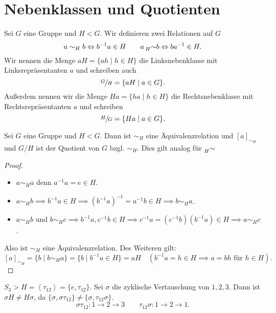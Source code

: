 \section{Nebenklassen und Quotienten}

\begin{definition}
	Sei $G$ eine Gruppe und $H < G$.
	Wir definieren zwei Relationen auf $G$ 
	\[
		a \sim_{H} b \Leftrightarrow b^{-1} a \in H \qquad a \prescript{}{H}{\sim} b \Leftrightarrow b a^{-1} \in H
	.\] 
	Wir nennen die Menge $a H = \{a h \mid h \in H\} $ die Linksnebenklasse mit Linksrepräsentanten $a$ und schreiben auch
	\[
	\sfrac{G}{H} = \{a H \mid a \in G\} 
	.\] 
	Außerdem nennen wir die Menge $H a = \{h a \mid h \in H\} $ die Rechtsnebenklasse mit Rechtsrepräsentanten $a$ und schreiben 
	\[
	\sfrac{H}{G} = \{H a \mid a \in G\} 
	.\] 
\end{definition}

\begin{lemma}
	Sei $G$ eine Gruppe und $H < G$. Dann ist $\sim_{H}$ eine Äquivalenzrelation und $[ a ]_{\sim_{H}}$ und $G / H$ ist der Quotient von $G$ bzgl. $\sim_{H}$.
	Dies gilt analog für $\prescript{}{H}{\sim}$
\end{lemma}

\begin{proof}
	\begin{itemize}
		\item $a \sim_{H} a$ denn $a^{-1} a = e \in H$.
		\item $a \sim_{H} b \implies b^{-1} a \in H \implies (b^{-1} a)^{-1} = a^{-1} b \in H \implies b \sim_{H} a$.
		\item $a \sim_{H} b $ und $b \sim_{H} c \implies b^{-1} a, c^{-1} b \in H \implies c^{-1} a = (c^{-1} b) (b^{-1} a) \in H \implies a \sim_{H} c$.
	\end{itemize}
	Also ist $\sim_{H}$ eine Äquivalenzrelation. Des Weiteren gilt:
	\[
		[ a ]_{\sim_{H}} = \{b \mid b \sim_{H} a \}  = \{b \mid b^{-1} a \in H\} = a H \quad (b^{-1} a = h \in H \implies a = b h \text{ für } h \in H)
	.\] 
\end{proof}

\begin{eg}	
	$S_{3} > H = \left< \tau_{12} \right> = \{e, \tau_{12}\} $. Sei $\sigma$ die zyklische Vertauschung von  $1,2,3$.
	Dann ist  $\sigma H \neq H \sigma$, da $\{\sigma, \sigma \tau_{12}\} \neq \{\sigma, \tau_{12} \sigma\} $.
	\[
	\sigma \tau_{12}: 1 \to 2 \to 3 \qquad \tau_{12} \sigma : 1 \to 2 \to 1
	.\] 
\end{eg}

